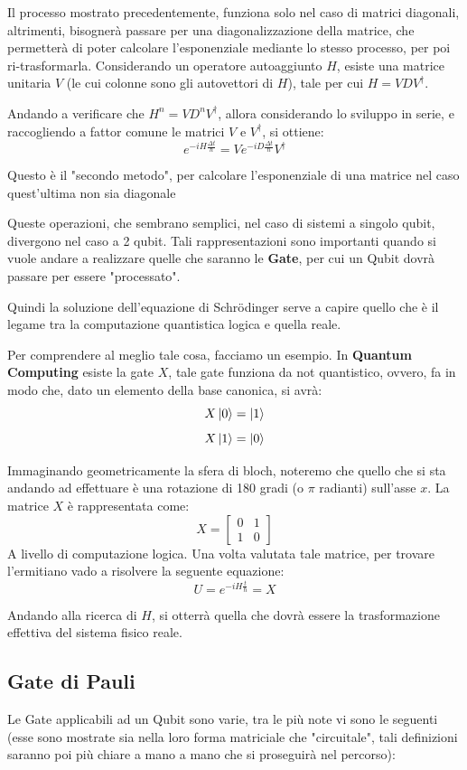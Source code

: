\begin{warn}
Il processo mostrato precedentemente, funziona solo nel caso di matrici diagonali, altrimenti, bisognerà passare per una diagonalizzazione della matrice, che permetterà di poter calcolare l'esponenziale mediante lo stesso processo, per poi ri-trasformarla.
Considerando un operatore autoaggiunto \(H\), esiste una matrice unitaria \(V\) (le cui colonne sono gli autovettori di \(H\)), tale per cui \(H=VDV^\dagger\).

Andando a verificare che \(H^n = V D^n V^\dagger\), allora considerando lo sviluppo in serie, e raccogliendo a fattor comune le matrici \(V\) e \(V^\dagger\), si ottiene:
\[
e^{-iH \frac{\Delta t}{\hbar}} = V e^{-iD \frac{\Delta t}{\hbar}} V^\dagger
\]

Questo è il "secondo metodo", per calcolare l'esponenziale di una matrice nel caso quest'ultima non sia diagonale
\end{warn}

Queste operazioni, che sembrano semplici, nel caso di sistemi a singolo qubit, divergono nel caso a 2 qubit. Tali rappresentazioni sono importanti quando si vuole andare a realizzare quelle che saranno le \textbf{Gate}, per cui un Qubit dovrà passare per essere "processato".

Quindi la soluzione dell'equazione di Schrödinger serve a capire quello che è il legame tra la computazione quantistica logica e quella reale. 

Per comprendere al meglio tale cosa, facciamo un esempio.
In \textbf{Quantum Computing} esiste la gate \(X\), tale gate funziona da not quantistico, ovvero, fa in modo che, dato un elemento della base canonica, si avrà:
\[
X \ket{0} = \ket{1}
\]
\[
X \ket{1} = \ket{0}
\]

Immaginando geometricamente la sfera di bloch, noteremo che quello che si sta andando ad effettuare è una rotazione di 180 gradi (o \(\pi\) radianti) sull'asse \(x\). La matrice \(X\) è rappresentata come:
\[
X = 
\begin{bmatrix}
0 & 1 \\
1 & 0
\end{bmatrix}
\]
A livello di computazione logica. Una volta valutata tale matrice, per trovare l'ermitiano vado a risolvere la seguente equazione:
\[
U = e^{-iH \frac{t}{\hbar}} = X
\]

Andando alla ricerca di \(H\), si otterrà quella che dovrà essere la trasformazione effettiva del sistema fisico reale.

\subsection{Gate di Pauli}
Le Gate applicabili ad un Qubit sono varie, tra le più note vi sono le seguenti (esse sono mostrate sia nella loro forma matriciale che "circuitale", tali definizioni saranno poi più chiare a mano a mano che si proseguirà nel percorso):


